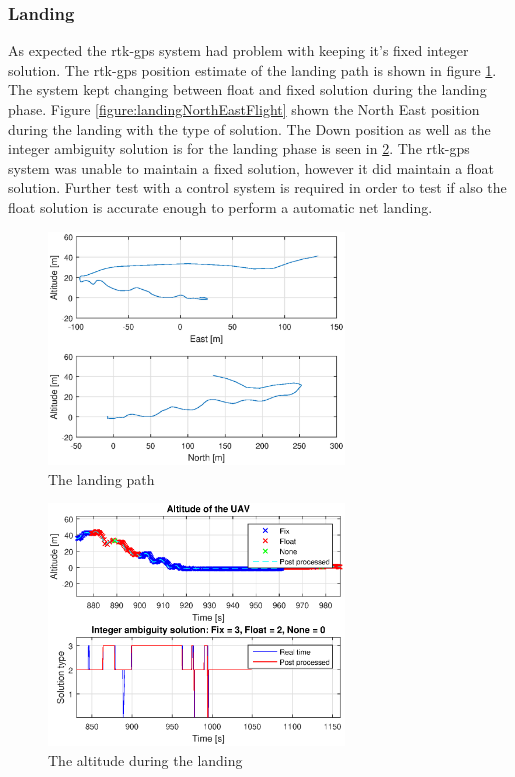 \subsubsection{Landing}
As expected the \gls{rtk-gps} system had problem with keeping it's fixed integer solution. The \gls{rtk-gps} position estimate of the landing path is shown in figure \ref{figure:landingPath}. The system kept changing between float and fixed solution during the landing phase. Figure \ref{figure:landingNorthEastFlight} shown the North East position during the landing with the type of solution. The Down position as well as the integer ambiguity solution is for the landing phase is seen in \ref{figure:landingDownFlight}. The \gls{rtk-gps} system was unable to maintain a fixed solution, however it did maintain a float solution. Further test with a control system is required in order to test if also the float solution is accurate enough to perform a automatic net landing.
\begin{figure}[H]
	\centering
		\includegraphics[width=0.7\textwidth]{figs/plots/landingPath.eps}
		\caption{The landing path}
		\label{figure:landingPath}
\end{figure}
\begin{figure}[H]
	\centering
		\includegraphics[width=0.7\textwidth]{figs/plots/landingDownFlight.eps}
		\caption{The altitude during the landing}
		\label{figure:landingDownFlight}
\end{figure}


